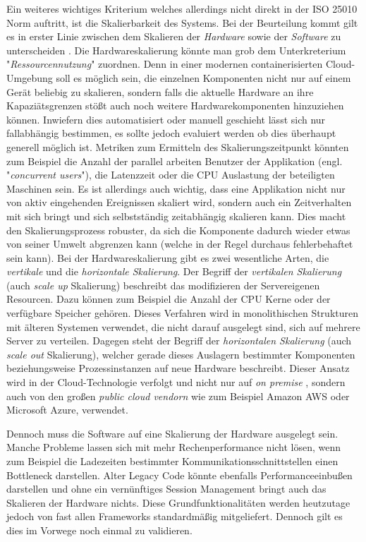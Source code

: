 Ein weiteres wichtiges Kriterium welches allerdings nicht direkt in der ISO 25010 Norm auftritt, ist die Skalierbarkeit des Systems. Bei der Beurteilung kommt gilt es in erster Linie zwischen dem Skalieren der \emph{Hardware} sowie der \emph{Software} zu unterscheiden \cite{nfr-dotnetcurry}. Die Hardwareskalierung könnte man grob dem Unterkreterium "\emph{Ressourcennutzung}" zuordnen. Denn in einer modernen containerisierten Cloud-Umgebung soll es möglich sein, die einzelnen Komponenten nicht nur auf einem Gerät beliebig zu skalieren, sondern falls die aktuelle Hardware an ihre Kapaziätsgrenzen stößt auch noch weitere Hardwarekomponenten hinzuziehen können. Inwiefern dies automatisiert oder manuell geschieht lässt sich nur fallabhängig bestimmen, es sollte jedoch evaluiert werden ob dies überhaupt generell möglich ist. Metriken zum Ermitteln des Skalierungszeitpunkt könnten zum Beispiel die Anzahl der parallel arbeiten Benutzer der Applikation (engl. "\emph{concurrent users}"), die Latenzzeit oder die CPU Auslastung der beteiligten Maschinen sein. Es ist allerdings auch wichtig, dass eine Applikation nicht nur von aktiv eingehenden Ereignissen skaliert wird, sondern auch ein Zeitverhalten mit sich bringt und sich selbstständig zeitabhängig skalieren kann. Dies macht den Skalierungsprozess robuster, da sich die Komponente dadurch wieder etwas von seiner Umwelt abgrenzen kann (welche in der Regel durchaus fehlerbehaftet sein kann). Bei der Hardwareskalierung gibt es zwei wesentliche Arten, die \emph{vertikale} und die \emph{horizontale Skalierung}. Der Begriff der \emph{vertikalen Skalierung} (auch \emph{scale up} Skalierung) beschreibt das modifizieren der Servereigenen Resourcen. Dazu können zum Beispiel die Anzahl der CPU Kerne oder der verfügbare Speicher gehören. Dieses Verfahren wird in monolithischen Strukturen mit älteren Systemen verwendet, die nicht darauf ausgelegt sind, sich auf mehrere Server zu verteilen. Dagegen steht der Begriff der \emph{horizontalen Skalierung} (auch \emph{scale out} Skalierung), welcher gerade dieses Auslagern bestimmter Komponenten beziehungsweise Prozessinstanzen auf neue Hardware beschreibt. Dieser Ansatz wird in der Cloud-Technologie verfolgt und nicht nur auf \emph{on premise} , sondern auch von den großen \emph{public cloud vendorn}  wie zum Beispiel Amazon AWS oder Microsoft Azure, verwendet.

Dennoch muss die Software auf eine Skalierung der Hardware ausgelegt sein. Manche Probleme lassen sich mit mehr Rechenperformance nicht lösen, wenn zum Beispiel die Ladezeiten bestimmter Kommunikationsschnittstellen einen Bottleneck darstellen. Alter Legacy Code könnte ebenfalls Performanceeinbußen darstellen und ohne ein vernünftiges Session Management bringt auch das Skalieren der Hardware nichts. Diese Grundfunktionalitäten werden heutzutage jedoch von fast allen Frameworks standardmäßig mitgeliefert. Dennoch gilt es dies im Vorwege noch einmal zu validieren. 


